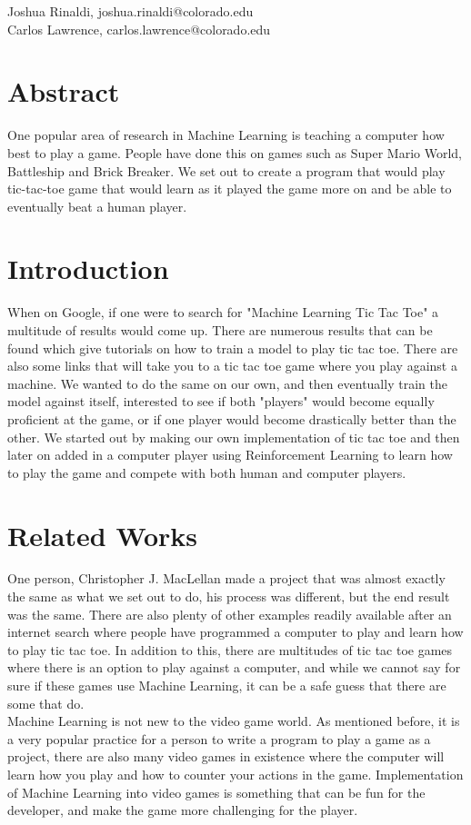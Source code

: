 \documentclass{article}
\begin{document}

\begin{center}
Joshua Rinaldi, joshua.rinaldi@colorado.edu\\
Carlos Lawrence, carlos.lawrence@colorado.edu
\end{center} 
\vskip 0.3in

\section{Abstract}
One popular area of research in Machine Learning is teaching a computer how best to play a game. People have done this on games such as Super Mario World, Battleship and Brick Breaker. We set out to create a program that would play tic-tac-toe game that would learn as it played the game more on and be able to eventually beat a human player.

\section{Introduction}
When on Google, if one were to search for "Machine Learning Tic Tac Toe" a multitude of results would come up. There are numerous results that can be found which give tutorials on how to train a model to play tic tac toe. There are also some links that will take you to a tic tac toe game where you play against a machine. We wanted to do the same on our own, and then eventually train the model against itself, interested to see if both "players" would become equally proficient at the game, or if one player would become drastically better than the other. We started out by making our own implementation of tic tac toe and then later on added in a computer player using Reinforcement Learning to learn how to play the game and compete with both human and computer players.

\section{Related Works}
One person, Christopher J. MacLellan made a project that was almost exactly the same as what we set out to do, his process was different, but the end result was the same. There are also plenty of other examples readily available after an internet search where people have programmed a computer to play and learn how to play tic tac toe. In addition to this, there are multitudes of tic tac toe games where there is an option to play against a computer, and while we cannot say for sure if these games use Machine Learning, it can be a safe guess that there are some that do. \\
Machine Learning is not new to the video game world. As mentioned before, it is a very popular practice for a person to write a program to play a game as a project, there are also many video games in existence where the computer will learn how you play and how to counter your actions in the game. Implementation of Machine Learning into video games is something that can be fun for the developer, and make the game more challenging for the player.
\end{document}
